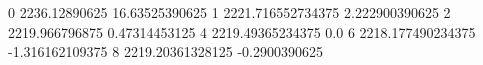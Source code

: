 0 2236.12890625 16.63525390625
1 2221.716552734375 2.222900390625
2 2219.966796875 0.47314453125
4 2219.49365234375 0.0
6 2218.177490234375 -1.316162109375
8 2219.20361328125 -0.2900390625
